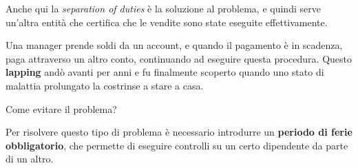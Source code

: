 \begin{Answer} [
  ref={fr2},
  number={2}
 ]

 \Question Anche qui la \textit{separation of duties} è la soluzione al
problema, e quindi serve un'altra entità che certifica che le vendite sono
state eseguite effettivamente.

\end{Answer}


\begin{Exercise} [
  title={Caso di Lepping},
  label={fr3}
 ]

 Una manager prende soldi da un account, e quando il pagamento è in scadenza,
paga attraverso un altro conto, continuando ad eseguire questa procedura.
Questo \textbf{lapping} andò avanti per anni e fu finalmente scoperto quando uno
stato di malattia prolungato la costrinse a stare a casa.

  \Question Come evitare il problema?
\end{Exercise}

\begin{Answer} [
  ref={fr3},
  number={3}
 ]

 \Question Per risolvere questo tipo di problema è necessario introdurre un
\textbf{periodo di ferie obbligatorio}, che permette di eseguire controlli
su un certo dipendente da parte di un altro.

\end{Answer}

